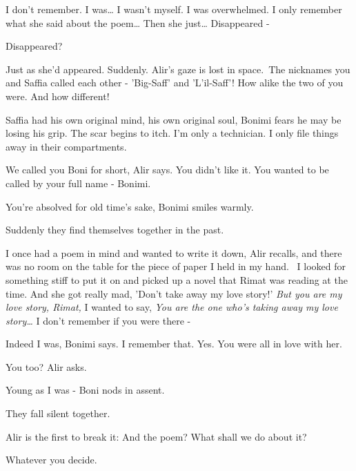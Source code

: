 \documentclass[letterpaper]{article}
\begin{document}
{\textquotedbl}I don't remember. I was{\dots} I wasn't myself. I was overwhelmed. I only remember what she said about
the poem{\dots} Then she just{\dots} Disappeared -{\textquotedbl} 

{\textquotedbl}Disappeared?{\textquotedbl} 

{\textquotedbl}Just as she'd appeared. Suddenly.{\textquotedbl} Alir's gaze is lost in space.\ {\textquotedbl}The
nicknames you and Saffia called each other - 'Big-Saff' and 'L'il-Saff'! How alike the two of you were. And how
different!{\textquotedbl} 

{\textquotedbl}Saffia had his own original mind, his own original soul,{\textquotedbl} Bonimi fears he may be losing his
grip. The scar begins to itch. {\textquotedbl}I'm only a technician. I only file things away in their
compartments.{\textquotedbl}

{\textquotedbl}We called you Boni for short,{\textquotedbl} Alir says. {\textquotedbl}You didn't like it. You wanted to
be called by your full name - Bonimi.{\textquotedbl}

{\textquotedbl}You're absolved for old time's sake,{\textquotedbl} Bonimi smiles warmly. 

Suddenly they find themselves together in the past. 

{\textquotedbl}I once had a poem in mind and wanted to write it down,{\textquotedbl} Alir recalls, {\textquotedbl}and
there was no room on the table for the piece of paper I held in my hand. ~I looked for something stiff to put it on and
picked up a novel that Rimat was reading at the time. And she got really mad, 'Don't take away my love story!'
\textit{But you are my love story, Rimat, }I wanted to say, \textit{You are the one who's taking away my love
story{\dots}} I don't remember if you were there -{\textquotedbl} 

{\textquotedbl}Indeed I was,{\textquotedbl} Bonimi says. {\textquotedbl}I remember that. Yes. You were all in love with
her.{\textquotedbl} 

{\textquotedbl}You too?{\textquotedbl} Alir asks. 

{\textquotedbl}Young as I was -{\textquotedbl} Boni nods in assent. 

They fall silent together.

Alir is the first to break it: {\textquotedbl}And the poem? What shall we do about it?{\textquotedbl} 

{\textquotedbl}Whatever you decide.{\textquotedbl}


\bigskip
\end{document}
